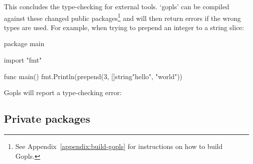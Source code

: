 This concludes the type-checking for external tools.
`gopls' can be compiled against these changed public packages\footnote{
See Appendix~\ref{appendix:build-gopls} for instructions on how to build Gopls.
} and will then return errors if the wrong types are used. For example, when trying
to prepend an integer to a string slice:

\begin{gocode}
package main

import "fmt"

func main() {
	fmt.Println(prepend(3, []string{"hello", "world"}))
}
\end{gocode}

Gopls will report a type-checking error:

\subsection{Private packages}

